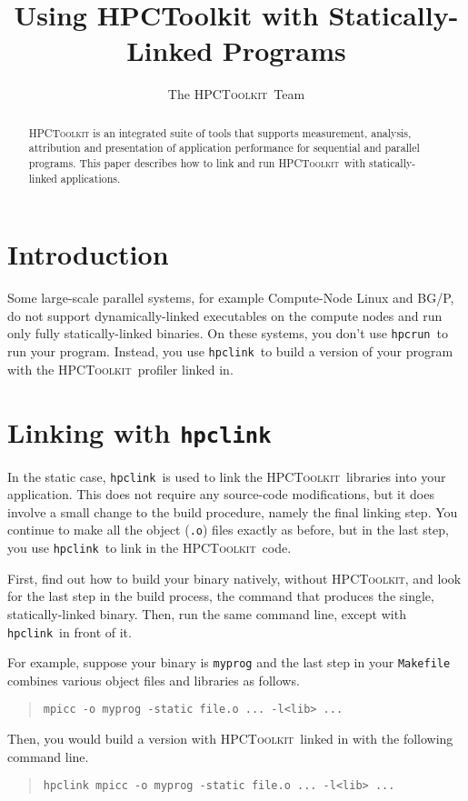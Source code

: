 \documentclass[12pt]{article}
\newcommand{\HPCToolkit}{\textsc{HPCToolkit}}
\newcommand{\hpcrun}{\texttt{hpcrun}}
\newcommand{\hpclink}{\texttt{hpclink}}
\begin{document}
\title{Using {\sc HPCToolkit} with Statically-Linked Programs}
\author{The \HPCToolkit\ Team}
\maketitle

\begin{abstract}
\HPCToolkit{} is an integrated suite of tools that supports
measurement, analysis, attribution and presentation of application
performance for sequential and parallel programs.  This paper
describes how to link and run \HPCToolkit\ with statically-linked
applications.
\end{abstract}

\section{Introduction}

Some large-scale parallel systems, for example Compute-Node Linux and
BG/P, do not support dynamically-linked executables on the compute
nodes and run only fully statically-linked binaries.  On these
systems, you don't use \hpcrun\ to run your program.  Instead, you use
\hpclink\ to build a version of your program with the \HPCToolkit\
profiler linked in.

\section{Linking with \hpclink }

In the static case, \hpclink\ is used to link the \HPCToolkit\
libraries into your application.  This does not require any
source-code modifications, but it does involve a small change to the
build procedure, namely the final linking step.  You continue to make
all the object ({\tt .o}) files exactly as before, but in the last
step, you use \hpclink\ to link in the \HPCToolkit\ code.

First, find out how to build your binary natively, without
\HPCToolkit, and look for the last step in the build process, the
command that produces the single, statically-linked binary.  Then, run
the same command line, except with \hpclink\ in front of it.

For example, suppose your binary is {\tt myprog} and the last step in
your {\tt Makefile} combines various object files and libraries as
follows.
%
\begin{quote}
\verb|mpicc -o myprog -static file.o ... -l<lib> ...|
\end{quote}
%
Then, you would build a version with \HPCToolkit\ linked in with the
following command line.
%
\begin{quote}
\verb|hpclink mpicc -o myprog -static file.o ... -l<lib> ...|
\end{quote}
\end{document}
